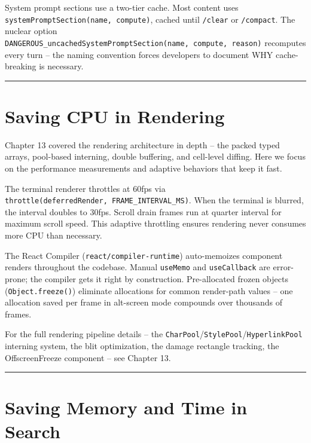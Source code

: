 \documentclass[
  english,
  11pt,
  letterpaper,
]{book}
\begin{document}
System prompt sections use a two-tier cache. Most content uses
\texttt{systemPromptSection(name,\ compute)}, cached until
\texttt{/clear} or \texttt{/compact}. The nuclear option
\texttt{DANGEROUS\_uncachedSystemPromptSection(name,\ compute,\ reason)}
recomputes every turn -- the naming convention forces developers to
document WHY cache-breaking is necessary.

\begin{center}\rule{0.5\linewidth}{0.5pt}\end{center}

\section{Saving CPU in Rendering}\label{saving-cpu-in-rendering}

Chapter 13 covered the rendering architecture in depth -- the packed
typed arrays, pool-based interning, double buffering, and cell-level
diffing. Here we focus on the performance measurements and adaptive
behaviors that keep it fast.

The terminal renderer throttles at 60fps via
\texttt{throttle(deferredRender,\ FRAME\_INTERVAL\_MS)}. When the
terminal is blurred, the interval doubles to 30fps. Scroll drain frames
run at quarter interval for maximum scroll speed. This adaptive
throttling ensures rendering never consumes more CPU than necessary.

The React Compiler (\texttt{react/compiler-runtime}) auto-memoizes
component renders throughout the codebase. Manual \texttt{useMemo} and
\texttt{useCallback} are error-prone; the compiler gets it right by
construction. Pre-allocated frozen objects (\texttt{Object.freeze()})
eliminate allocations for common render-path values -- one allocation
saved per frame in alt-screen mode compounds over thousands of frames.

For the full rendering pipeline details -- the
\texttt{CharPool}/\texttt{StylePool}/\texttt{HyperlinkPool} interning
system, the blit optimization, the damage rectangle tracking, the
OffscreenFreeze component -- see Chapter 13.

\begin{center}\rule{0.5\linewidth}{0.5pt}\end{center}

\section{Saving Memory and Time in
Search}\label{saving-memory-and-time-in-search}
\end{document}
